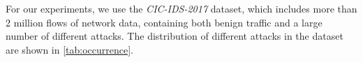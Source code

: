 \documentclass[conference]{IEEEtran}
\begin{document}

For our experiments, we use the \textit{CIC-IDS-2017} \cite{sharafaldin_toward_2018} dataset, which includes more than 2 million flows of network data, containing both benign traffic and a large number of different attacks. The distribution of different attacks in the dataset are shown in \autoref{tab:occurrence}.
\end{document}
